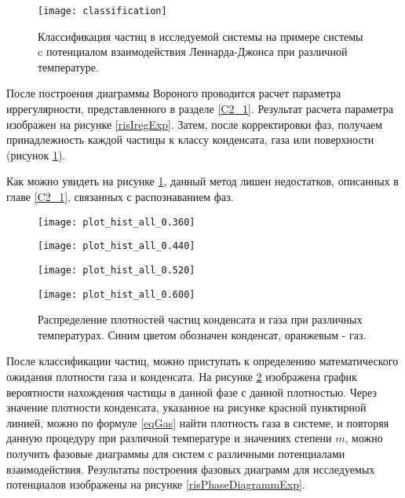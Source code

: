 \begin{figure}[h]
\begin{center}
\texttt{[image: classification]}
\caption{Классификация частиц в исследуемой системы на примере системы c потенциалом взаимодействия Леннарда-Джонса при различной температуре.}
\label{risClassExp}
\end{center}
\end{figure}

После построения диаграммы Вороного проводится расчет параметра иррегулярности, представленного в разделе \ref{C2_1}. Результат расчета параметра изображен на рисунке \ref{risIregExp}. Затем, после корректировки фаз, получаем принадлежность каждой частицы к классу конденсата, газа или поверхности (рисунок \ref{risClassExp}).

Как можно увидеть на рисунке \ref{risClassExp}, данный метод лишен недостатков, описанных в главе \ref{C2_1}, связанных с распознаванием фаз.

\begin{figure}[h]
\begin{center}

\begin{minipage}[h]{0.45\linewidth}
\texttt{[image: plot\_hist\_all\_0.360]}
\end{minipage}
\begin{minipage}[h]{0.45\linewidth}
\texttt{[image: plot\_hist\_all\_0.440]}
\end{minipage}

\begin{minipage}[h]{0.45\linewidth}
\texttt{[image: plot\_hist\_all\_0.520]}
\end{minipage}
\begin{minipage}[h]{0.45\linewidth}
\texttt{[image: plot\_hist\_all\_0.600]}
\end{minipage}
\caption{Распределение плотностей частиц конденсата и газа при различных температурах. Синим цветом обозначен конденсат, оранжевым  - газ.}
\label{risRhoM}
\end{center}
\end{figure}

После классификации частиц, можно приступать к определению математического ожидания плотности газа и конденсата. На рисунке \ref{risRhoM} изображена график вероятности нахождения частицы в данной фазе с данной плотностью. Через значение плотности конденсата, указанное на рисунке красной пунктирной линией, можно по формуле \ref{eqGas} найти плотность газа в системе, и повторяя данную процедуру при различной температуре и значениях степени $m$, можно получить фазовые диаграммы для систем с различными потенциалами взаимодействия. Результаты построения фазовых диаграмм для исследуемых потенциалов изображены на рисунке \ref{risPhaseDiagrammExp}.

